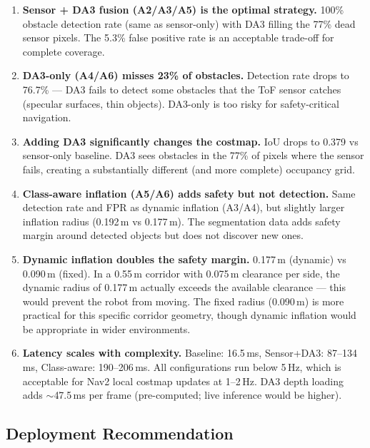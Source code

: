 \documentclass[11pt,a4paper]{article}
\begin{document}
\begin{enumerate}[nosep]
  \item \textbf{Sensor + DA3 fusion (A2/A3/A5) is the optimal strategy.}
    100\% obstacle detection rate (same as sensor-only) with DA3 filling
    the 77\% dead sensor pixels. The 5.3\% false positive rate is an
    acceptable trade-off for complete coverage.

  \item \textbf{DA3-only (A4/A6) misses 23\% of obstacles.}
    Detection rate drops to 76.7\% --- DA3 fails to detect some obstacles
    that the ToF sensor catches (specular surfaces, thin objects). DA3-only
    is too risky for safety-critical navigation.

  \item \textbf{Adding DA3 significantly changes the costmap.}
    IoU drops to 0.379 vs sensor-only baseline. DA3 sees obstacles in the
    77\% of pixels where the sensor fails, creating a substantially different
    (and more complete) occupancy grid.

  \item \textbf{Class-aware inflation (A5/A6) adds safety but not detection.}
    Same detection rate and FPR as dynamic inflation (A3/A4), but slightly
    larger inflation radius (0.192\,m vs 0.177\,m). The segmentation data
    adds safety margin around detected objects but does not discover new ones.

  \item \textbf{Dynamic inflation doubles the safety margin.}
    0.177\,m (dynamic) vs 0.090\,m (fixed). In a 0.55\,m corridor with
    0.075\,m clearance per side, the dynamic radius of 0.177\,m actually
    exceeds the available clearance --- this would prevent the robot from
    moving. The fixed radius (0.090\,m) is more practical for this specific
    corridor geometry, though dynamic inflation would be appropriate in
    wider environments.

  \item \textbf{Latency scales with complexity.}
    Baseline: 16.5\,ms, Sensor+DA3: 87--134\,ms, Class-aware: 190--206\,ms.
    All configurations run below 5\,Hz, which is acceptable for Nav2 local
    costmap updates at 1--2\,Hz. DA3 depth loading adds $\sim$47.5\,ms per
    frame (pre-computed; live inference would be higher).
\end{enumerate}

\subsection{Deployment Recommendation}
\end{document}
